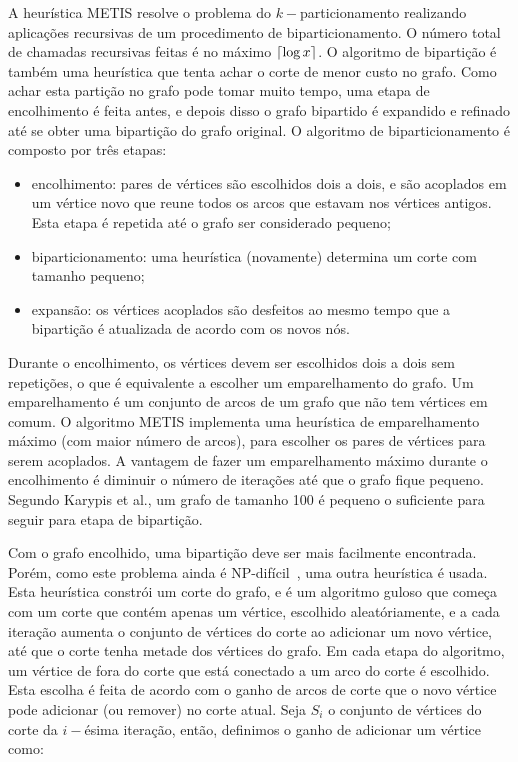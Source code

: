 \documentclass[conference]{IEEEtran}
\DeclarePairedDelimiter\ceil{\lceil}{\rceil}
\begin{document}
A heurística METIS resolve o problema do $k-$particionamento realizando
aplicações recursivas de um procedimento de biparticionamento. O número
total de chamadas recursivas feitas é no máximo $\ceil{\log x}$. O 
algoritmo de bipartição é também uma heurística que tenta achar o
corte de menor custo no grafo. Como achar esta partição no grafo pode 
tomar muito tempo, uma etapa de encolhimento é feita antes, e depois 
disso o grafo bipartido é expandido e refinado até se obter uma 
bipartição do grafo original. O algoritmo de biparticionamento é 
composto por três etapas:
\begin{itemize}
\item{encolhimento:} pares de vértices são escolhidos dois 
    a dois, e são acoplados em um vértice novo que reune todos os arcos
    que estavam nos vértices antigos. Esta etapa é repetida até o 
    grafo ser considerado pequeno;
\item{biparticionamento:} uma heurística (novamente) determina um corte
    com tamanho pequeno;
\item{expansão:} os vértices acoplados são desfeitos ao mesmo tempo que
    a bipartição é atualizada de acordo com os novos nós.
\end{itemize}

Durante o encolhimento, os vértices devem ser escolhidos dois a dois sem
repetições, o que é equivalente a escolher um emparelhamento do grafo.
Um emparelhamento é um conjunto de arcos de um grafo que não tem 
vértices em comum. O algoritmo METIS implementa uma heurística
de emparelhamento máximo (com maior número de arcos), para escolher os
pares de vértices para serem acoplados. A vantagem de fazer um 
emparelhamento máximo durante o encolhimento é diminuir o número de
iterações até que o grafo fique pequeno. Segundo Karypis et al., um
grafo de tamanho 100 é pequeno o suficiente para seguir para etapa de 
bipartição.

Com o grafo encolhido, uma bipartição deve ser mais facilmente 
encontrada. Porém, como este problema ainda é 
NP-difícil~\cite{graphpartitioning}, uma outra heurística é usada. Esta
heurística constrói um corte do grafo, e é um algoritmo guloso que 
começa com um corte que contém apenas um vértice, escolhido 
aleatóriamente, e a cada iteração aumenta o conjunto de vértices do 
corte ao adicionar um novo vértice, até que o corte tenha metade dos 
vértices do grafo. Em cada etapa do algoritmo, um vértice de fora do 
corte que está conectado a um arco do corte é escolhido. Esta escolha é 
feita de acordo com o ganho de arcos de corte que o novo vértice pode 
adicionar (ou remover) no corte atual. Seja $S_i$ o conjunto de vértices 
do corte da $i-$ésima iteração, então, definimos o ganho de adicionar um 
vértice como:
\end{document}
